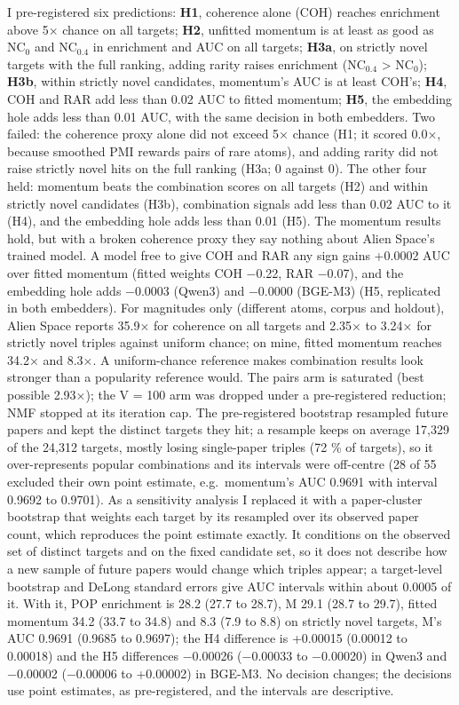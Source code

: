 \documentclass[
  10pt,
]{article}
\begin{document}
I pre-registered six predictions:
\textbf{H1}, coherence alone (COH)
reaches enrichment above 5× chance on
all targets; \textbf{H2}, unfitted
momentum is at least as good as NC\(_0\)
and NC\(_{0.4}\) in enrichment and AUC
on all targets; \textbf{H3a}, on
strictly novel targets with the full
ranking, adding rarity raises enrichment
(NC\(_{0.4}\) \textgreater{} NC\(_0\));
\textbf{H3b}, within strictly novel
candidates, momentum's AUC is at least
COH's; \textbf{H4}, COH and RAR add less
than 0.02 AUC to fitted momentum;
\textbf{H5}, the embedding hole adds
less than 0.01 AUC, with the same
decision in both embedders. Two failed:
the coherence proxy alone did not exceed
5× chance (H1; it scored 0.0×, because
smoothed PMI rewards pairs of rare
atoms), and adding rarity did not raise
strictly novel hits on the full ranking
(H3a; 0 against 0). The other four held:
momentum beats the combination scores on
all targets (H2) and within strictly
novel candidates (H3b), combination
signals add less than 0.02 AUC to it
(H4), and the embedding hole adds less
than 0.01 (H5). The momentum results
hold, but with a broken coherence proxy
they say nothing about Alien Space's
trained model. A model free to give COH
and RAR any sign gains +0.0002 AUC over
fitted momentum (fitted weights COH
−0.22, RAR −0.07), and the embedding
hole adds −0.0003 (Qwen3) and −0.0000
(BGE-M3) (H5, replicated in both
embedders). For magnitudes only
(different atoms, corpus and holdout),
Alien Space reports 35.9× for coherence
on all targets and 2.35× to 3.24× for
strictly novel triples against uniform
chance; on mine, fitted momentum reaches
34.2× and 8.3×. A uniform-chance
reference makes combination results look
stronger than a popularity reference
would. The pairs arm is saturated (best
possible 2.93×); the V = 100 arm was
dropped under a pre-registered
reduction; NMF stopped at its iteration
cap. The pre-registered bootstrap
resampled future papers and kept the
distinct targets they hit; a resample
keeps on average 17,329 of the 24,312
targets, mostly losing single-paper
triples (72 \% of targets), so it
over-represents popular combinations and
its intervals were off-centre (28 of 55
excluded their own point estimate,
e.g.~momentum's AUC 0.9691 with interval
0.9692 to 0.9701). As a sensitivity
analysis I replaced it with a
paper-cluster bootstrap that weights
each target by its resampled over its
observed paper count, which reproduces
the point estimate exactly. It
conditions on the observed set of
distinct targets and on the fixed
candidate set, so it does not describe
how a new sample of future papers would
change which triples appear; a
target-level bootstrap and DeLong
standard errors give AUC intervals
within about 0.0005 of it. With it, POP
enrichment is 28.2 (27.7 to 28.7), M
29.1 (28.7 to 29.7), fitted momentum
34.2 (33.7 to 34.8) and 8.3 (7.9 to 8.8)
on strictly novel targets, M's AUC
0.9691 (0.9685 to 0.9697); the H4
difference is +0.00015 (0.00012 to
0.00018) and the H5 differences −0.00026
(−0.00033 to −0.00020) in Qwen3 and
−0.00002 (−0.00006 to +0.00002) in
BGE-M3. No decision changes; the
decisions use point estimates, as
pre-registered, and the intervals are
descriptive.
\end{document}
